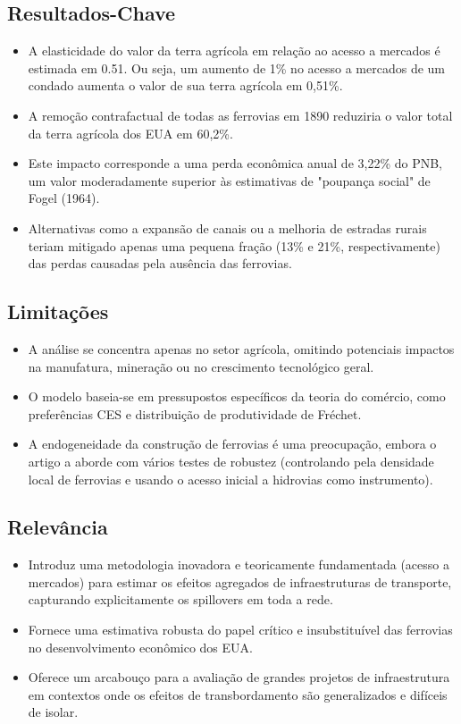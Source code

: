 \documentclass[12pt]{article}
\begin{document}
\subsection*{Resultados-Chave}
\begin{itemize}
    \item A elasticidade do valor da terra agrícola em relação ao acesso a mercados é estimada em 0.51. Ou seja, um aumento de 1\% no acesso a mercados de um condado aumenta o valor de sua terra agrícola em 0,51\%.
    \item A remoção contrafactual de todas as ferrovias em 1890 reduziria o valor total da terra agrícola dos EUA em 60,2\%.
    \item Este impacto corresponde a uma perda econômica anual de 3,22\% do PNB, um valor moderadamente superior às estimativas de "poupança social" de Fogel (1964).
    \item Alternativas como a expansão de canais ou a melhoria de estradas rurais teriam mitigado apenas uma pequena fração (13\% e 21\%, respectivamente) das perdas causadas pela ausência das ferrovias.
\end{itemize}

\subsection*{Limitações}
\begin{itemize}
    \item A análise se concentra apenas no setor agrícola, omitindo potenciais impactos na manufatura, mineração ou no crescimento tecnológico geral.
    \item O modelo baseia-se em pressupostos específicos da teoria do comércio, como preferências CES e distribuição de produtividade de Fréchet.
    \item A endogeneidade da construção de ferrovias é uma preocupação, embora o artigo a aborde com vários testes de robustez (controlando pela densidade local de ferrovias e usando o acesso inicial a hidrovias como instrumento).
\end{itemize}

\subsection*{Relevância}
\begin{itemize}
    \item Introduz uma metodologia inovadora e teoricamente fundamentada (acesso a mercados) para estimar os efeitos agregados de infraestruturas de transporte, capturando explicitamente os spillovers em toda a rede.
    \item Fornece uma estimativa robusta do papel crítico e insubstituível das ferrovias no desenvolvimento econômico dos EUA.
    \item Oferece um arcabouço para a avaliação de grandes projetos de infraestrutura em contextos onde os efeitos de transbordamento são generalizados e difíceis de isolar.
\end{itemize}
\newpage
\end{document}
